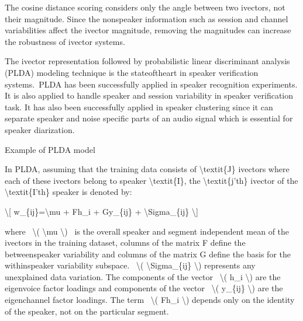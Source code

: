 \documentclass[letterpaper,10pt,english]{jupyterBook}
\begin{document}
\sphinxAtStartPar
The cosine distance scoring considers only the angle between two
i\sphinxhyphen{}vectors, not their magnitude. Since the non\sphinxhyphen{}speaker information such
as session and channel variabilities affect the i\sphinxhyphen{}vector magnitude,
removing the magnitudes can increase the robustness of i\sphinxhyphen{}vector systems.

\sphinxAtStartPar
{}

\sphinxAtStartPar
The i\sphinxhyphen{}vector representation followed by probabilistic linear
discriminant analysis (PLDA) modeling technique is the state\sphinxhyphen{}of\sphinxhyphen{}the\sphinxhyphen{}art
in speaker verification systems. PLDA has been successfully applied in
speaker recognition experiments. It is also applied to handle speaker
and session variability in speaker verification task. It has also been
successfully applied in speaker clustering since it can separate speaker
and noise specific parts of an audio signal which is essential for
speaker diarization.

\sphinxAtStartPar


\sphinxAtStartPar
Example of PLDA model

\sphinxAtStartPar
In PLDA, assuming that the training data consists of \textbackslash{}textit\{J\}
i\sphinxhyphen{}vectors where each of these i\sphinxhyphen{}vectors belong to speaker \textbackslash{}textit\{I\},
the \textbackslash{}textit\{j’th\} i\sphinxhyphen{}vector of the \textbackslash{}textit\{I’th\} speaker is denoted by:

\sphinxAtStartPar
\textbackslash{}{[} w\_\{ij\}=\textbackslash{}mu + Fh\_i + Gy\_\{ij\} + \textbackslash{}Sigma\_\{ij\} \textbackslash{}{]}

\sphinxAtStartPar
where  \textbackslash{}( \textbackslash{}mu \textbackslash{})  is the overall speaker and segment independent mean
of the i\sphinxhyphen{}vectors in the training dataset, columns of the matrix F define
the between\sphinxhyphen{}speaker variability and columns of the matrix G define the
basis for the within\sphinxhyphen{}speaker variability subspace.  \textbackslash{}( \textbackslash{}Sigma\_\{ij\}
\textbackslash{}) represents any unexplained data variation. The components of the
vector  \textbackslash{}( h\_i \textbackslash{}) are the eigenvoice factor loadings and components of
the vector  \textbackslash{}( y\_\{ij\} \textbackslash{}) are the eigen\sphinxhyphen{}channel factor loadings. The
term  \textbackslash{}( Fh\_i \textbackslash{}) depends only on the identity of the speaker, not on
the particular segment.
\end{document}
